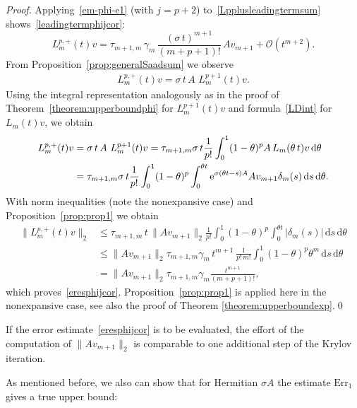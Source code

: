\documentclass[smallextended]{svjour3pre}%
\numberwithin{equation}{section}
\numberwithin{figure}{section}
\numberwithin{table}{section}
\newcommand\tjnew[1]{{#1}}
\newcommand{\dd}{\mathrm{d}}
\newcommand{\ee}{{\rm e}}
\newcommand\Erone{\mathrm{Err}_1}
\newcommand\sca{\sigma}
\newcommand\Opgen{A}
\begin{document}
\begin{proof}
Applying~\eqref{em-phi-e1} (with $j=p+2$) to~\eqref{Lpplusleadingtermsum} shows~\eqref{leadingtermphijcor}:
\begin{equation*}
L^{p,+}_m(t)v = \tau_{m+1,m}\, \gamma_m\, \frac{(\sca\,t)^{m+1}}{(m+p+1)!} \,\Opgen v_{m+1} + \mathcal{O}(t^{m+2}).
\end{equation*}
From Proposition~\ref{prop:generalSaadsum} we observe
\begin{align*}
L^{p,+}_m(t)v = \sigma\,t\,\Opgen \,\,L^{p+1}_m(t)v.
\end{align*}
Using the integral representation analogously as in the proof of Theorem~\ref{theorem:upperboundphi} for $L^{p+1}_m(t)v$ and
formula~\eqref{LDint} for $L_m(t)v$, we obtain
\begin{align*}
L^{p,+}_m(t)v &= \sigma\,t\,\Opgen\,\, L^{p+1}_m(t)v = \tau_{m+1,m} \sigma\,t \frac{1}{p!} \int_0^1 (1-\theta)^{p} \Opgen\, L_m(\theta\,t)v \,\dd \theta\\
&= \tau_{m+1,m} \sigma\,t \frac{1}{p!} \int_0^1 (1-\theta)^{p} \int_0^{\theta t} \ee^{\sca (\theta t-s) \Opgen} \Opgen v_{m+1} \delta_m( s)\,\dd s \,\dd \theta.
\end{align*}
With norm inequalities \tjnew{(note the nonexpansive case)} and Proposition~\ref{prop:prop1} we obtain
\begin{align*}
\|L^{p,+}_m(t)v\|_2 &\leq \tau_{m+1,m} \,t\,\|\Opgen v_{m+1}\|_2 \frac{1}{p!} \int_0^1 (1-\theta)^{p} \int_0^{\theta t}  |\delta_m( s)|\,\dd s \,\dd \theta\\
&\leq \|\Opgen v_{m+1}\|_2 \tau_{m+1,m} \gamma_m\, t^{m+1}\,\frac{1}{p!\,m!} \int_0^1 (1-\theta)^{p} \theta ^m\,\dd s \,\dd \theta\\
&= \|\Opgen v_{m+1}\|_2  \tau_{m+1,m} \gamma_m \frac{t^{m+1}}{(m+p+1)!},
\end{align*}
which proves~\eqref{eresphijcor}. 
\tjnew{Proposition~\ref{prop:prop1} is applied here in the nonexpansive case,
see also the proof of Theorem \ref{theorem:upperboundexp}.}\hfill\qed
\end{proof}

If the error estimate~\eqref{eresphijcor}
is to be evaluated, the effort of the computation of $\|\Opgen v_{m+1}\|_2$
is comparable to one additional step of the \tjnew{Krylov} iteration.

As mentioned before, we also can show that for Hermitian $\sca\Opgen$
the estimate $\Erone$ gives a \tjnew{true} upper bound:
\end{document}
